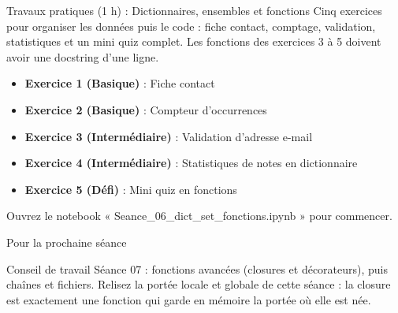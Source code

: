 \documentclass[aspectratio=169,11pt]{beamer}
\begin{document}
\begin{frame}{Travaux pratiques (1 h) : Dictionnaires, ensembles et fonctions}
Cinq exercices pour organiser les données puis le code : fiche contact, comptage, validation, statistiques et un mini quiz complet. Les fonctions des exercices 3 à 5 doivent avoir une docstring d'une ligne.

\begin{itemize}
  \setlength{\itemsep}{1.5pt}\setlength{\parskip}{0pt}
  \item \textbf{Exercice 1 (Basique)} : Fiche contact
  \item \textbf{Exercice 2 (Basique)} : Compteur d'occurrences
  \item \textbf{Exercice 3 (Intermédiaire)} : Validation d'adresse e-mail
  \item \textbf{Exercice 4 (Intermédiaire)} : Statistiques de notes en dictionnaire
  \item \textbf{Exercice 5 (Défi)} : Mini quiz en fonctions
\end{itemize}
\vspace{4pt}

{\small\color{PyGris}Ouvrez le notebook « Seance\_06\_dict\_set\_fonctions.ipynb » pour commencer.}
\end{frame}
\begin{frame}{Pour la prochaine séance}
\begin{exampleblock}{Conseil de travail}
Séance 07 : fonctions avancées (closures et décorateurs), puis chaînes et fichiers. Relisez la portée locale et globale de cette séance : la closure est exactement une fonction qui garde en mémoire la portée où elle est née.
\end{exampleblock}
\end{frame}
\end{document}

